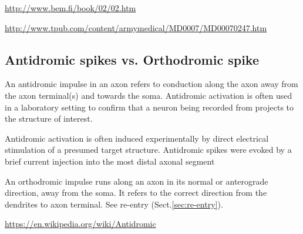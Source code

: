 


\url{http://www.bem.fi/book/02/02.htm}

\url{http://www.tpub.com/content/armymedical/MD0007/MD00070247.htm}

\subsection{Antidromic spikes vs. Orthodromic spike}
\label{sec:antidromic-impulse}

An antidromic impulse in an axon refers to conduction along the axon away from
the axon terminal(s) and towards the soma.
Antidromic activation is often used in a laboratory setting to confirm that a
neuron being recorded from projects to the structure of interest.

Antidromic activation is often induced experimentally by direct electrical
stimulation of a presumed target structure.
Antidromic spikes were evoked by a brief current injection into the
most distal axonal segment


An orthodromic impulse runs along an axon in its normal or anterograde
direction, away from the soma. It refers to the correct direction from the
dendrites to axon terminal. See re-entry (Sect.\ref{sec:re-entry}).

\url{https://en.wikipedia.org/wiki/Antidromic}

